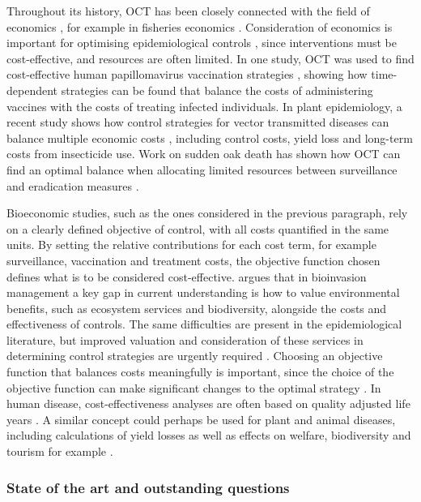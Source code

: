 Throughout its history, OCT has been closely connected with the field of economics \citep{weber_optimal_2011}, for example in fisheries economics \citep{clark_economics_1975}. Consideration of economics is important for optimising epidemiological controls \citep{perrings_merging_2014}, since interventions must be cost-effective, and resources are often limited. In one study, OCT was used to find cost-effective human papillomavirus vaccination strategies \citep{brown_role_2011}, showing how time-dependent strategies can be found that balance the costs of administering vaccines with the costs of treating infected individuals. In plant epidemiology, a recent study shows how control strategies for vector transmitted diseases can balance multiple economic costs \citep{bokil_optimal_2019}, including control costs, yield loss and long-term costs from insecticide use. Work on sudden oak death has shown how OCT can find an optimal balance when allocating limited resources between surveillance and eradication measures \citep{ndeffo_mbah_balancing_2010}.

Bioeconomic studies, such as the ones considered in the previous paragraph, rely on a clearly defined objective of control, with all costs quantified in the same units. By setting the relative contributions for each cost term, for example surveillance, vaccination and treatment costs, the objective function chosen defines what is to be considered cost-effective. \citet{epanchin-niell_economics_2017} argues that in bioinvasion management a key gap in current understanding is how to value environmental benefits, such as ecosystem services and biodiversity, alongside the costs and effectiveness of controls. The same difficulties are present in the epidemiological literature, but improved valuation and consideration of these services in determining control strategies are urgently required \citep{boyd_consequence_2013}. Choosing an objective function that balances costs meaningfully is important, since the choice of the objective function can make significant changes to the optimal strategy \citep{probert_decision_2016}. In human disease, cost-effectiveness analyses are often based on quality adjusted life years \citep{whitehead_health_2010}. A similar concept could perhaps be used for plant and animal diseases, including calculations of yield losses \citep{savary_crop_2012, savary_global_2019} as well as effects on welfare, biodiversity and tourism for example \citep{boyd_consequence_2013}.

\subsubsection{State of the art and outstanding questions}

